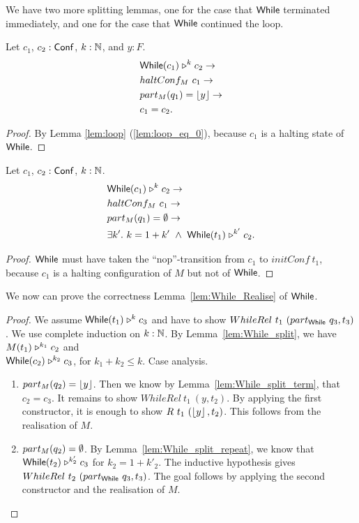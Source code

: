 We have two more splitting lemmas, one for the case that $\mathsf{While}$ terminated immediately, and one for the case that $\mathsf{While}$ continued the loop.
\begin{lemma}
  \label{lem:While_split_term}
  Let $c_1$, $c_2 : \mathsf{Conf}$, $k:\mathbb{N}$, and $y:F$.
  \begin{alignat*}{1}
    & \mathsf{While}(c_1) \mathrel{\triangleright}^k c_2 \rightarrow \\
    & haltConf_M~c_1 \rightarrow \\
    & part_M(q_1) = \left\lfloor {y} \right\rfloor \rightarrow \\
    & c_1 = c_2.
  \end{alignat*}
\end{lemma}
\begin{proof}
  By Lemma \ref{lem:loop} (\ref{lem:loop_eq_0}), because $c_1$ is a halting state of $\mathsf{While}$.
\end{proof}
\begin{lemma}
  \label{lem:While_split_repeat}
  Let $c_1$, $c_2 : \mathsf{Conf}$, $k:\mathbb{N}$.
  \begin{alignat*}{1}
    & \mathsf{While}(c_1) \mathrel{\triangleright}^k c_2 \rightarrow \\
    & haltConf_M~c_1 \rightarrow \\
    & part_M(q_1) = \emptyset \rightarrow \\
    & \exists k'.~k = 1+k' ~\land~ \mathsf{While}(t_1) \mathrel{\triangleright}^{k'} c_2.
  \end{alignat*}
\end{lemma}
\begin{proof}
  $\mathsf{While}$ must have taken the ``nop''-transition from $c_1$ to $initConf~t_1$, because $c_1$ is a halting configuration of $M$ but not of $\mathsf{While}$.
\end{proof}

We now can prove the correctness Lemma~\ref{lem:While_Realise} of $\mathsf{While}$.
\begin{proof}
  We assume $\mathsf{While}(t_1) \mathrel{\triangleright}^k c_3$ and have to show $WhileRel~t_1~(part_{\mathsf{While}}~q_3, t_3)$.  We use complete induction on $k:\mathbb{N}$.  By
  Lemma~\ref{lem:While_split}, we have $M(t_1) \mathrel{\triangleright}^{k_1} c_2$ and\\ $\mathsf{While}(c_2) \mathrel{\triangleright}^{k_2} c_3$, for $k_1+k_2 \leq k$.  Case analysis.
  \begin{enumerate}
  \item $part_M(q_2) = \left\lfloor {y} \right\rfloor$.  Then we know by Lemma~\ref{lem:While_split_term}, that $c_2=c_3$.  It remains to show $WhileRel~t_1~(y, t_2)$.  By
    applying the first constructor, it is enough to show $R~t_1~(\left\lfloor {y} \right\rfloor, t_2)$.  This follows from the realisation of $M$.
  \item $part_M(q_2) = \emptyset$.  By Lemma~\ref{lem:While_split_repeat}, we know that $\mathsf{While}(t_2) \mathrel{\triangleright}^{k'_2} c_3$ for $k_2 = 1 + k'_2$.  The
    inductive hypothesis gives $WhileRel~t_2~(part_{\mathsf{While}}~q_3, t_3)$.  The goal follows by applying the second constructor and the realisation of $M$.
  \end{enumerate}
\end{proof}


